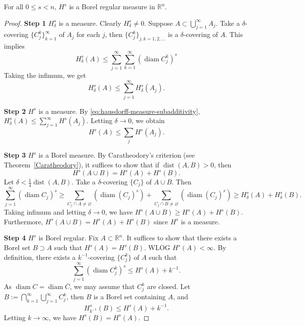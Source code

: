     \begin{theorem}\label{thm:hausdorff-borel-regular}
        For all $0\leq s<n$, $H^{s}$ is a Borel regular measure in $\mathbb{R}^{n}$.
    \end{theorem}
    \begin{proof}
        \textbf{Step 1} $H^{s}_{\delta}$ is a measure. Clearly $H^{s}_{\delta}\neq 0$. Suppose $A \subset \bigcup _{j=1}^{\infty}A_{j}$. Take a $\delta$-covering $\{ C_{j}^{k} \}_{k=1}^{\infty}$ of $A_{j}$ for each $j$, then $\{ C_{j}^{k} \}_{j,k=1,2,\dots}$ is a $\delta$-covering of $A$. This implies
        \[
        H^{s}_{\delta}(A)\leq \sum _{j=1}^{\infty}\sum _{k=1}^{\infty}(\operatorname{diam}C_{j}^{k})^{s}
        \]
        Taking the infimum, we get
        \begin{equation}
            H^{s}_{\delta}(A)\leq \sum _{j=1}^{\infty}H_{\delta}^{s}(A_{j}). \label{eq:hausdorff-measure-subadditivity}
        \end{equation}

        \textbf{Step 2} $H^{s}$ is a measure. By \eqref{eq:hausdorff-measure-subadditivity}, $H_{\delta}^{s}(A)\leq \sum _{j=1}^{\infty}H^{s}(A_{j})$. Letting $\delta\to 0$, we obtain
        \[
        H^{s}(A)\leq \sum _{j}H^{s}(A_{j}).
        \]

        \textbf{Step 3} $H^{s}$ is a Borel measure. By Caratheodory's criterion (see Theorem~\ref{Caratheodory}), it suffices to show that if $\operatorname{dist}(A,B)>0$, then
        \[
        H^{s}(A\cup B)= H^{s}(A)+H^{s}(B).
        \]
        Let $\delta< \frac{1}{4}\operatorname{dist}(A,B)$. Take a $\delta$-covering $\{ C_{j} \}$ of $A\cup B$. Then
        \[
        \sum _{j=1}^{\infty}(\operatorname{diam}C_{j})^{s}\geq \sum _{C_{j}\cap A\neq \varnothing}(\operatorname{diam}(C_{j})^{s})+\sum _{C_{j}\cap B\neq \varnothing}(\operatorname{diam}(C_{j})^{s})\geq H_{\delta}^{s}(A)+H_{\delta}^{s}(B).
        \]
        Taking infimum and letting $\delta\to 0$, we have $H^{s}(A\cup B)\geq H^{s}(A)+H^{s}(B)$. Furthermore, $H^{s}(A\cup B)=H^{s}(A)+H^{s}(B)$ since $H^{s}$ is a measure.

        \textbf{Step 4} $H^{s}$ is Borel regular. Fix $A\subset \mathbb{R}^{n}$. It suffices to show that there exists a Borel set $B\supset A$ such that $H^{s}(A)=H^{s}(B)$. WLOG $H^{s}(A)<\infty$. By definition, there exists a $k^{-1}$-covering $\{ C_{j}^{k} \}$ of $A$ such that
        \[
        \sum _{j=1}^{\infty}(\operatorname{diam}C_{j}^{k})^{s}\leq H^{s}(A)+k^{-1}.
        \]
        As $\operatorname{diam}C=\operatorname{diam}\bar{C}$, we may assume that $C_{j}^{k}$ are closed. Let $B:=\bigcap _{k=1}^{\infty}\bigcup _{j=1}^{\infty}C_{j}^{k}$, then $B$ is a Borel set containing $A$, and
        \[
        H_{k^{-1}}^{s}(B)\leq H^{s}(A)+k^{-1}.
        \]
        Letting $k\to \infty$, we have $H^{s}(B)=H^{s}(A)$.
    \end{proof}

